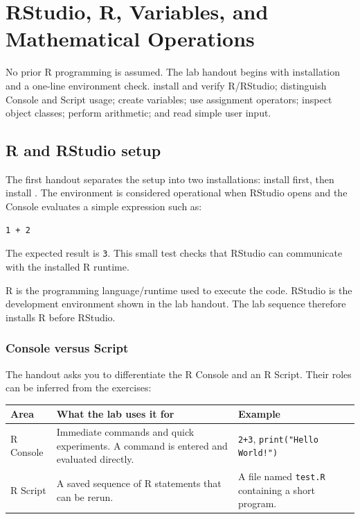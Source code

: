 \chapter{RStudio, R, Variables, and Mathematical Operations}
\label{chap:r-basics}

\chapterguide
  {No prior R programming is assumed. The lab handout begins with installation and a one-line environment check.}
  {install and verify R/RStudio; distinguish Console and Script usage; create variables; use assignment operators; inspect object classes; perform arithmetic; and read simple user input.}

\section{R and RStudio setup}

The first handout separates the setup into two installations: install  first, then install . The environment is considered operational when RStudio opens and the Console evaluates a simple expression such as:

\begin{lstlisting}[style=dsr]
1 + 2
\end{lstlisting}

The expected result is \texttt{3}. This small test checks that RStudio can communicate with the installed R runtime.

\begin{keyidea}
R is the programming language/runtime used to execute the code. RStudio is the development environment shown in the lab handout. The lab sequence therefore installs R before RStudio.
\end{keyidea}

\subsection{Console versus Script}

The handout asks you to differentiate the R Console and an R Script. Their roles can be inferred from the exercises:

\begin{dstable}
\begin{tabularx}{\linewidth}{@{}p{3.0cm}X X@{}}
\toprule
\rowcolor{DSPaleBlue!92}
Area & What the lab uses it for & Example \\
\midrule
R Console & Immediate commands and quick experiments. A command is entered and evaluated directly. & \texttt{2+3}, \texttt{print("Hello World!")} \\
R Script & A saved sequence of R statements that can be rerun. & A file named \texttt{test.R} containing a short program. \\
\bottomrule
\end{tabularx}
\end{dstable}

